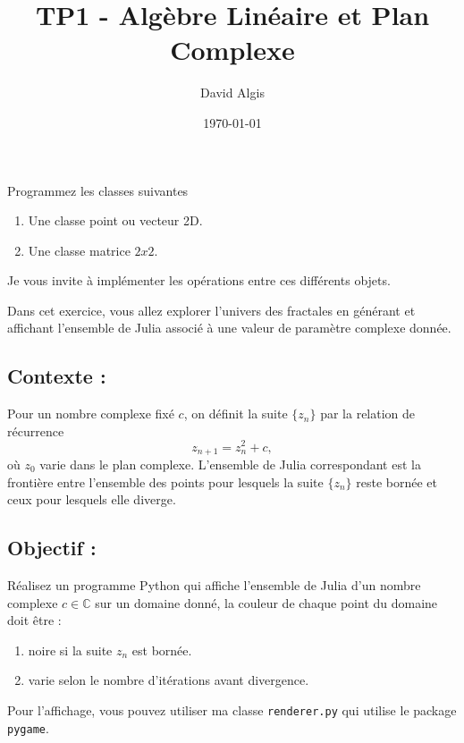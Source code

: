 \documentclass[a4paper,12pt]{article}
\title{TP1 - Algèbre Linéaire et Plan Complexe}
\author{David Algis}
\date{\today}
\begin{document}
\makeonlytitle




Programmez les classes suivantes
\begin{enumerate}
    \item Une classe point ou vecteur 2D.
    \item Une classe matrice $2x2$.
\end{enumerate}

Je vous invite à implémenter les opérations entre ces différents objets.




Dans cet exercice, vous allez explorer l'univers des fractales en générant et affichant l'ensemble de Julia associé à une valeur de paramètre complexe donnée. 


\subsection{Contexte :}
Pour un nombre complexe fixé \( c \), on définit la suite \(\{z_n\}\) par la relation de récurrence
\[
z_{n+1} = z_n^2 + c,
\]
où \(z_0\) varie dans le plan complexe. L'ensemble de Julia correspondant est la frontière entre l'ensemble des points pour lesquels la suite \(\{z_n\}\) reste bornée et ceux pour lesquels elle diverge.

\bigskip

\subsection{Objectif :}
Réalisez un programme Python qui affiche l'ensemble de Julia d'un nombre complexe $c\in \mathbb{C}$ sur un domaine donné, la couleur de chaque point du domaine doit être :
\begin{enumerate}
    \item noire si la suite $z_n$ est bornée.
    \item varie selon le nombre d'itérations avant divergence.
\end{enumerate}

Pour l'affichage, vous pouvez utiliser ma classe \texttt{renderer.py} qui utilise le package \texttt{pygame}.

\end{document}

